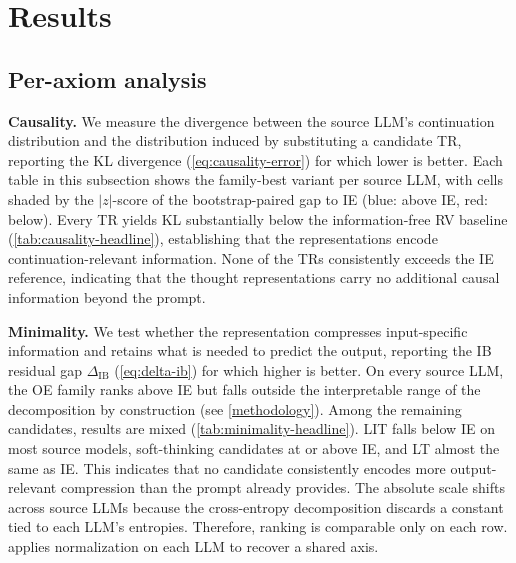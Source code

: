 \section{Results}
\label{sec:results}

\subsection{Per-axiom analysis}
\label{sec:results:per-axiom}


\textbf{Causality.} We measure the divergence between the source LLM's continuation distribution and the distribution induced by substituting a candidate TR, reporting the KL divergence (\cref{eq:causality-error}) for which lower is better. Each table in this subsection shows the family-best variant per source LLM, with cells shaded by the $|z|$-score of the bootstrap-paired gap to IE (blue: above IE, red: below). Every TR yields KL substantially below the information-free RV baseline (\cref{tab:causality-headline}), establishing that the representations encode continuation-relevant information. None of the TRs consistently exceeds the IE reference, indicating that the thought representations carry no additional causal information beyond the prompt.


\textbf{Minimality.} We test whether the representation compresses input-specific information and retains what is needed to predict the output, reporting the IB residual gap $\Delta_{\text{IB}}$ (\cref{eq:delta-ib}) for which higher is better. On every source LLM, the OE family ranks above IE but falls outside the interpretable range of the decomposition by construction (see \cref{methodology}). Among the remaining candidates, results are mixed (\cref{tab:minimality-headline}). LIT falls below IE on most source models, soft-thinking candidates at or above IE, and LT almost the same as IE. This indicates that no candidate consistently encodes more output-relevant compression than the prompt already provides. The absolute scale shifts across source LLMs because the cross-entropy decomposition discards a constant tied to each LLM's entropies. Therefore, ranking is comparable only on each row.  applies normalization on each LLM to recover a shared axis.

